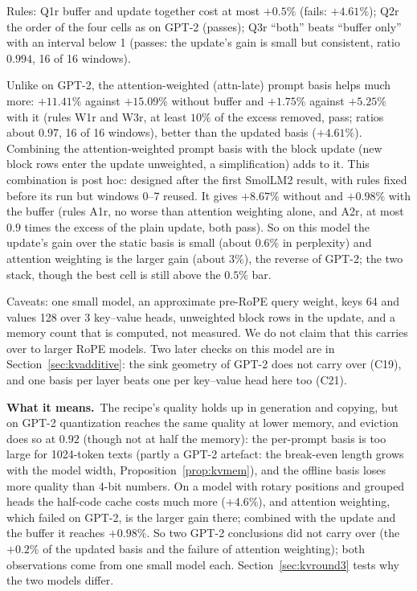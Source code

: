 \documentclass[10pt]{article}
\theoremstyle{plain}
\theoremstyle{definition}
\theoremstyle{remark}
\newcommand{\means}{\noindent\textbf{What it means.}\ }
\newcommand{\rl}[1]{\textsf{#1}}%
\begin{document}
Rules: \rl{Q1r} buffer and update together cost at most $+0.5\%$ (fails: $+4.61\%$); \rl{Q2r} the order of the four cells as on GPT-2 (passes); \rl{Q3r} ``both'' beats ``buffer only'' with an interval below 1 (passes: the update's gain is small but consistent, ratio $0.994$, 16 of 16 windows).

Unlike on GPT-2, the attention-weighted (attn-late) prompt basis helps much more: $+11.41\%$ against $+15.09\%$ without buffer and $+1.75\%$ against $+5.25\%$ with it (rules \rl{W1r} and \rl{W3r}, at least $10\%$ of the excess removed, pass; ratios about $0.97$, 16 of 16 windows), better than the updated basis ($+4.61\%$). Combining the attention-weighted prompt basis with the block update (new block rows enter the update unweighted, a simplification) adds to it. This combination is post hoc: designed after the first SmolLM2 result, with rules fixed before its run but windows 0--7 reused. It gives $+8.67\%$ without and $+0.98\%$ with the buffer (rules \rl{A1r}, no worse than attention weighting alone, and \rl{A2r}, at most $0.9$ times the excess of the plain update, both pass). So on this model the update's gain over the static basis is small (about $0.6\%$ in perplexity) and attention weighting is the larger gain (about $3\%$), the reverse of GPT-2; the two stack, though the best cell is still above the $0.5\%$ bar.

Caveats: one small model, an approximate pre-RoPE query weight, keys 64 and values 128 over 3 key--value heads, unweighted block rows in the update, and a memory count that is computed, not measured. We do not claim that this carries over to larger RoPE models. Two later checks on this model are in Section~\ref{sec:kvadditive}: the sink geometry of GPT-2 does not carry over (C19), and one basis per layer beats one per key--value head here too (C21).

\means The recipe's quality holds up in generation and copying, but on GPT-2 quantization reaches the same quality at lower memory, and eviction does so at $0.92$ (though not at half the memory): the per-prompt basis is too large for 1024-token texts (partly a GPT-2 artefact: the break-even length grows with the model width, Proposition~\ref{prop:kvmem}), and the offline basis loses more quality than 4-bit numbers. On a model with rotary positions and grouped heads the half-code cache costs much more ($+4.6\%$), and attention weighting, which failed on GPT-2, is the larger gain there; combined with the update and the buffer it reaches $+0.98\%$. So two GPT-2 conclusions did not carry over (the $+0.2\%$ of the updated basis and the failure of attention weighting); both observations come from one small model each. Section~\ref{sec:kvround3} tests why the two models differ.
\end{document}
